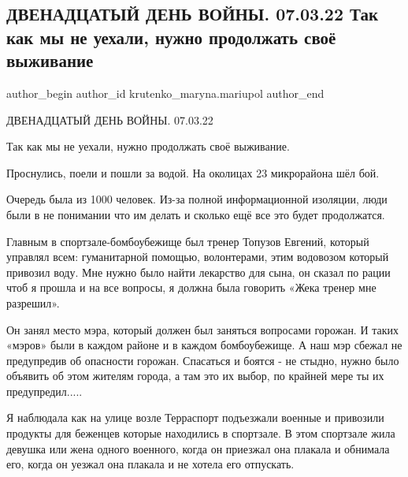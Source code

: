  
 
 
 
 

\subsection{ДВЕНАДЦАТЫЙ ДЕНЬ ВОЙНЫ. 07.03.22 Так как мы не уехали, нужно продолжать своё выживание}
\label{sec:07_03_2023.fb.krutenko_maryna.mariupol.1.12_den_07_03_vyzhyvanie_prodolzhat}

\ifcmt
 author_begin
   author_id krutenko_maryna.mariupol
 author_end
\fi

ДВЕНАДЦАТЫЙ ДЕНЬ ВОЙНЫ. 07.03.22

Так как мы не уехали, нужно продолжать своё выживание. 

Проснулись, поели и пошли за водой. На околицах 23 микрорайона шёл бой. 

Очередь была из 1000 человек. Из-за полной информационной изоляции, люди были в
не понимании что им делать и сколько ещё все это будет продолжатся. 

Главным в спортзале-бомбоубежище был тренер Топузов Евгений, который управлял
всем: гуманитарной помощью, волонтерами, этим водовозом который привозил воду.
Мне нужно было найти лекарство для сына, он сказал по рации чтоб я прошла и на
все вопросы, я должна была говорить «Жека тренер мне разрешил».

Он занял место мэра, который должен был заняться вопросами горожан. И таких
«мэров» были в каждом районе и в каждом бомбоубежище. А наш мэр сбежал не
предупредив об опасности горожан. Спасаться и боятся - не стыдно, нужно было
объявить об этом жителям города, а там это их выбор, по крайней мере ты их
предупредил.....

Я наблюдала как на улице возле Терраспорт подъезжали военные и привозили
продукты для беженцев которые находились в спортзале. В этом спортзале жила
девушка или жена одного военного, когда он приезжал она плакала и обнимала его,
когда он уезжал она плакала и не хотела его отпускать. 

